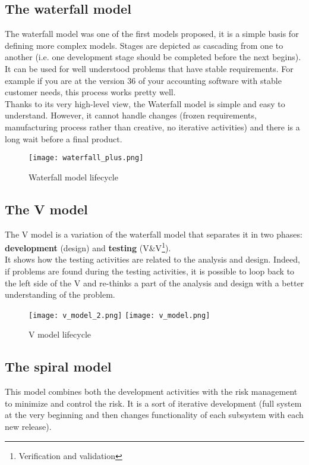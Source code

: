 \subsection{The waterfall model} The waterfall model was one of the first
models proposed, it is a simple basis for defining more complex models. Stages are depicted as cascading from one to another (i.e. one development stage should be completed before the next begins).\\

It can be used for well understood problems that have stable requirements. For example if you are at the version 36 of your accounting software with stable customer needs, this process works pretty well.\\

Thanks to its very high-level view, the Waterfall model is simple and easy to understand.
However, it cannot handle changes (frozen requirements, manufacturing process rather than creative, no iterative activities) and there is a long wait before a final product.

\begin{figure}[!ht]
    \centering
    \texttt{[image: waterfall\_plus.png]}
    \caption{Waterfall model lifecycle}
\end{figure}
\FloatBarrier{}

\subsection{The V model}

The V model is a variation of the waterfall model that separates it in two phases: \textbf{development} (design) and \textbf{testing} (V\&V\footnote{Verification and
validation}).\\

It shows how the testing activities are related to the analysis and design. Indeed, if problems are found during the testing activities, it is possible to loop back to the left side of the V and re-thinks a part of the analysis and design with a better understanding of the problem.

\begin{figure}[!ht]
    \centering
    \texttt{[image: v\_model\_2.png]}
    \texttt{[image: v\_model.png]}
    \caption{V model lifecycle}
\end{figure}
\FloatBarrier{}

\subsection{The spiral model}
This model combines both the development activities with the risk management to minimize and
control the risk. It is a sort of iterative development (full system at the very
beginning and then changes functionality of each subsystem with each new
release). \newline

